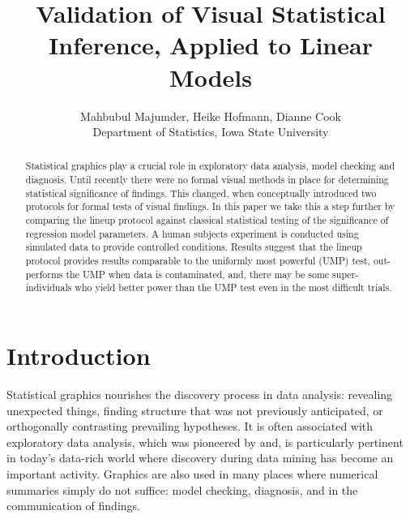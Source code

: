 \documentclass{article}
\begin{document}
\title{Validation of Visual Statistical Inference, Applied to Linear Models}
\author{Mahbubul Majumder, Heike Hofmann, Dianne Cook\\
        Department of Statistics, Iowa State University}
\maketitle

\begin {abstract}  
Statistical graphics play a crucial role in exploratory data analysis, model checking and diagnosis. Until recently there were no formal visual methods in place for determining statistical significance of findings. This changed, when \citet{buja:2009} conceptually introduced two protocols for formal tests of visual findings. In this paper we take this a step further by comparing the lineup protocol \citep{buja:2009} against classical statistical testing  of the significance of regression model parameters. A human subjects experiment is conducted using simulated data to provide controlled conditions. Results suggest that the lineup protocol provides results comparable to the uniformly most powerful (UMP) test, out-performs the UMP when data is contaminated, and, there may be some super-individuals who yield better power than the UMP test even in the most difficult trials.
\end {abstract}


\section{Introduction} 


Statistical graphics nourishes the discovery process in data analysis: revealing unexpected things,  finding structure that was not previously anticipated,  or orthogonally contrasting prevailing hypotheses. It is often associated with exploratory data analysis, which was pioneered by \cite{tukey:eda} and, is particularly pertinent in today's data-rich world where discovery during data mining has become an important activity. Graphics are also used in many places where numerical summaries simply do not suffice: model checking, diagnosis, and in the communication of findings. 
\end{document}
